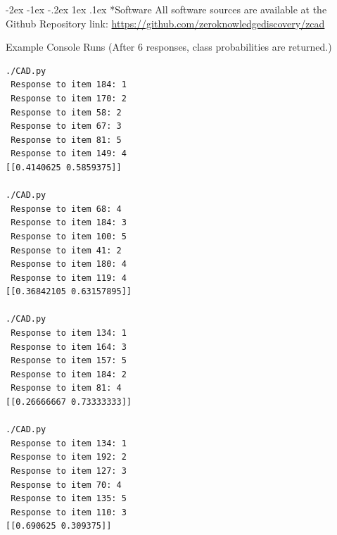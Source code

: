 \documentclass[twocolumn,,9pt]{IEEEtran}
\makeatletter
\renewcommand\section{\@startsection {section}{1}{\z@}%
  {-2ex \@plus -1ex \@minus -.2ex}%
  {1ex \@plus.1ex}%
  {\large\bfseries\scshape}}
\renewcommand{\captionN}[1]{\caption{\color{CadetBlue4!80!black} \sffamily \fontsize{8}{9}\selectfont #1  }}
\makeatother
\begin{document}
\section*{Software}
All software sources are available at the Github Repository link:
\href{https://github.com/zeroknowledgediscovery/zcad}{https://github.com/zeroknowledgediscovery/zcad}

\begin{table}[t]
  \captionN{Example Console Runs (After 6 responses, class probabilities are returned.)}\label{tab2}

\begin{verbatim}
./CAD.py 
 Response to item 184: 1
 Response to item 170: 2
 Response to item 58: 2
 Response to item 67: 3
 Response to item 81: 5
 Response to item 149: 4
[[0.4140625 0.5859375]]

./CAD.py 
 Response to item 68: 4
 Response to item 184: 3
 Response to item 100: 5
 Response to item 41: 2
 Response to item 180: 4
 Response to item 119: 4
[[0.36842105 0.63157895]]

./CAD.py 
 Response to item 134: 1
 Response to item 164: 3
 Response to item 157: 5
 Response to item 184: 2
 Response to item 81: 4
[[0.26666667 0.73333333]]

./CAD.py 
 Response to item 134: 1
 Response to item 192: 2
 Response to item 127: 3
 Response to item 70: 4
 Response to item 135: 5
 Response to item 110: 3
[[0.690625 0.309375]]
\end{verbatim}

\vspace{300pt}

\end{table}



\end{document}
